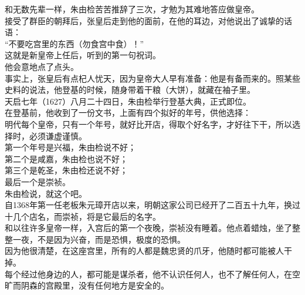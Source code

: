 \begin{multicols}{\theparacolNo}
和无数先辈一样，朱由检苦苦推辞了三次，才勉为其难地答应做皇帝。\\

接受了群臣的朝拜后，张皇后走到他的面前，在他的耳边，对他说出了诚挚的话语：\\

“不要吃宫里的东西（勿食宫中食）！”\\

这就是新皇帝上任后，听到的第一句祝词。\\

他会意地点了点头。\\

事实上，张皇后有点杞人忧天，因为皇帝大人早有准备：他是有备而来的。照某些史料的说法，他登基的时候，随身带着干粮（大饼），就藏在袖子里。\\

天启七年（1627）八月二十四日，朱由检举行登基大典，正式即位。\\

在登基前，他收到了一份文书，上面有四个拟好的年号，供他选择：\\

明代每个皇帝，只有一个年号，就好比开店，得取个好名字，才好往下干，所以选择时，必须谦虚谨慎。\\

第一个年号是兴福，朱由检说不好；\\

第二个是咸嘉，朱由检也说不好；\\

第三个是乾圣，朱由检还说不好；\\

最后一个是崇祯。\\

朱由检说，就这个吧。\\

自1368年第一任老板朱元璋开店以来，明朝这家公司已经开了二百五十九年，换过十几个店名，而崇祯，将是它最后的名字。\\

和以往许多皇帝一样，入宫后的第一个夜晚，崇祯没有睡着。他点着蜡烛，坐了整整一夜，不是因为兴奋，而是恐惧，极度的恐惧。\\

因为他很清楚，在这座宫里，所有的人都是魏忠贤的爪牙，他随时都可能被人干掉。\\

每个经过他身边的人，都可能是谋杀者，他不认识任何人，也不了解任何人，在空旷而阴森的宫殿里，没有任何地方是安全的。\\


\end{multicols}
